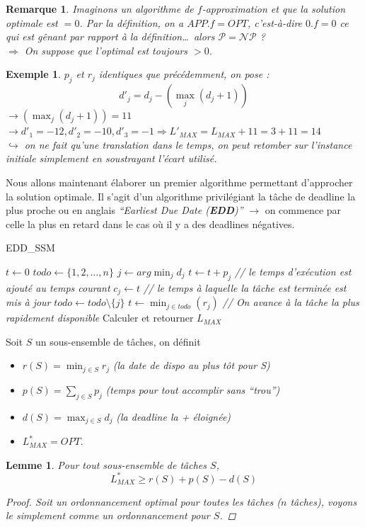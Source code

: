 \documentclass{article}
\newtheorem{exemple}{Exemple}[section]
\newtheorem{rem}{Remarque}[section]
\newtheorem{lemme}{Lemme}[section]
\newtheorem{proof}{Preuve}[section]
\begin{document}
\begin{sffamily}
\begin{rem}
Imaginons un algorithme de $f$-\textit{approximation} et que la solution
optimale est $=0$. Par la définition, on a $APP.f=OPT$, c'est-à-dire $0.f = 0$
ce qui est gênant par rapport à la définition\dots~alors
$\mathcal{P} = \mathcal{NP}$ ? \\
$\Rightarrow$ On suppose que l'optimal est toujours $> 0$.
\end{rem}

\begin{exemple}
$p_j$ et $r_j$ identiques que précédemment, on pose :
		  $$d'_j = d_j - (\max_j (d_j + 1))$$
$\rightarrow (\max_j (d_j + 1)) = 11$\\
$\rightarrow d'_1 = -12, d'_2 = -10, d'_3 = -1 \Rightarrow L'_{MAX} = L_{MAX} +
11 = 3+11 = 14$ \\
$\hookrightarrow$ on ne fait qu'une translation dans le temps, on peut retomber
sur l'instance initiale simplement en soustrayant l'écart utilisé.
\end{exemple}

Nous allons maintenant élaborer un premier algorithme permettant d'approcher la
solution optimale. Il s'agit d'un algorithme privilégiant la tâche de deadline
la plus proche ou en anglais \textit{``Earliest Due Date (\textbf{EDD})''}
$\rightarrow$ on commence par celle la plus en retard dans le cas où il y a des
deadlines négatives.

\begin{algorithm}[h!]
\caption{EDD\_SSM}
\begin{algorithmic}[1]
\STATE $t\leftarrow 0$
\STATE $todo \leftarrow \{1,2,\ldots,n\}$
\STATE $j\leftarrow arg\min_j{d_j}$
\STATE $t\leftarrow t+p_j$ \textit{// le temps d'exécution est ajouté au temps
courant}
\STATE $c_j \leftarrow t$ \textit{// le temps à laquelle la tâche est terminée
est mis à jour}
\STATE $todo \leftarrow todo \setminus \{j\}$
\ELSE
\STATE $t\leftarrow \min_{j\in todo}(r_j)$ \textit{// On avance à la tâche la
plus rapidement disponible}
\ENDIF
\ENDWHILE
\STATE Calculer et retourner $L_{MAX}$
\end{algorithmic}
\end{algorithm}

Soit $S$ un sous-ensemble de tâches, on définit
\begin{itemize}
\item $r(S) = \min_{j\in S} r_j$ \textit{(la date de dispo au plus tôt pour S)}
\item $p(S) = \sum_{j\in S} p_j$ \textit{(temps pour tout accomplir sans
``trou'')}
\item $d(S) = \max_{j\in S} d_j$ \textit{(la deadline la + éloignée)}
\item $L^*_{MAX} = OPT$.
\end{itemize}
\newpage
\begin{lemme} Pour tout sous-ensemble de tâches $S$,
$$ L^*_{MAX} \geq r(S) + p(S) - d(S) $$
\begin{proof}
Soit un ordonnancement optimal pour toutes les tâches ($n$ tâches), voyons le
simplement comme un ordonnancement pour $S$.


\end{proof}
\end{lemme}
\end{sffamily}
\end{document}
